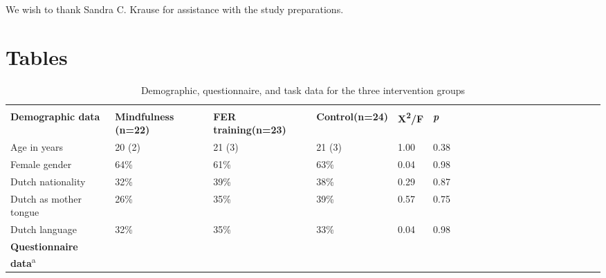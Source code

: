 \documentclass[authordate, empirical, issue]{jote-new-article}
\begin{document}
We wish to thank Sandra C. Krause for assistance with the study preparations.


\printbibliography
\onecolumn

\section{Tables}



\begin{table}[h!]
  \begin{fullwidth}
    \caption{Demographic, questionnaire, and task data for the three intervention groups}
    \begin{tabularx}{\linewidth}{@{} l l l l l l l l l l l l l l l l l l l l l  @{}}
      \multicolumn{6}{l}{}
      \\

      \textbf{Demographic data}                                 & \textbf{Mindfulness (n=22)} & \textbf{FER training(n=23)}
                                                                & \textbf{Control(n=24)}      & \textbf{X\textsuperscript{2}/F} & \textbf{\emph{p}}               \\

      Age in years                                              & 20 (2)                      & 21 (3)                          & 21 (3)            & 1.00 & 0.38 \\

      Female gender                                             & 64\%                        & 61\%                            & 63\%              & 0.04 & 0.98 \\

      Dutch nationality                                         & 32\%                        & 39\%                            & 38\%              & 0.29 & 0.87 \\

      Dutch as mother tongue                                    & 26\%                        & 35\%                            & 39\%              & 0.57 & 0.75 \\

      Dutch language                                            & 32\%                        & 35\%                            & 33\%              & 0.04 & 0.98 \\

      \textbf{Questionnaire data}\textsuperscript{a}                                                                                                              \\


\end{tabularx}
\end{fullwidth}
\end{table}
\end{document}
